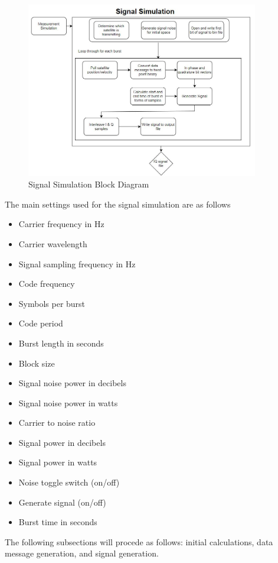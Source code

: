 \documentclass[12pt]{report}
\begin{document}
\begin{figure}[h]
    \centering
    \includegraphics[width=4in]{SignalSimBlock}
    \caption{Signal Simulation Block Diagram}
    \label{fig:SigSimBlock}
\end{figure}

The main settings used for the signal simulation are as follows
\begin{itemize}
    \item Carrier frequency in Hz
    \item Carrier wavelength 
    \item Signal sampling frequency in Hz 
    \item Code frequency
    \item Symbols per burst
    \item Code period 
    \item Burst length in seconds
    \item Block size
    \item Signal noise power in decibels
    \item Signal noise power in watts
    \item Carrier to noise ratio
    \item Signal power in decibels
    \item Signal power in watts
    \item Noise toggle switch (on/off)
    \item Generate signal (on/off)
    \item Burst time in seconds
\end{itemize}
The following subsections will procede as follows: initial calculations, data message generation, and signal generation.
\end{document}

